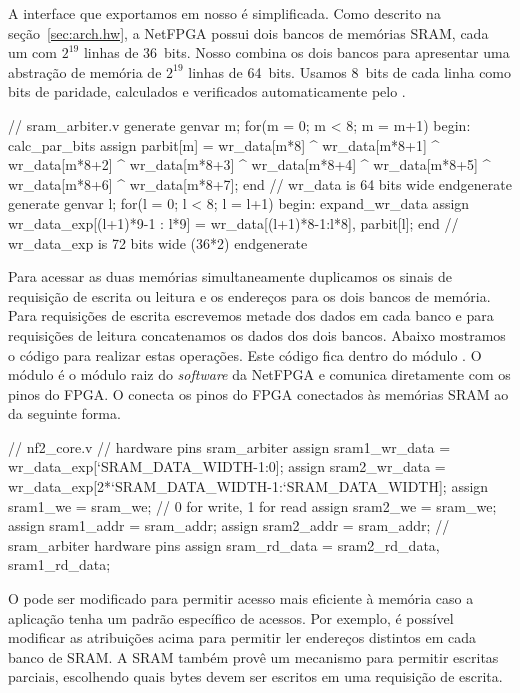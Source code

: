 A interface que exportamos em nosso  é
simplificada.  Como descrito na seção~\ref{sec:arch.hw}, a NetFPGA
possui dois bancos de memórias SRAM, cada um com $2^{19}$ linhas de
36~bits.  Nosso  combina os dois bancos para
apresentar uma abstração de memória de $2^{19}$ linhas de 64~bits.
Usamos 8~bits de cada linha como bits de paridade, calculados e
verificados automaticamente pelo .

\begin{verilogcode}
   // sram_arbiter.v
   generate
      genvar m;
      for(m = 0; m < 8; m = m+1) begin: calc_par_bits
      assign parbit[m] = wr_data[m*8] ^ wr_data[m*8+1] ^
            wr_data[m*8+2] ^ wr_data[m*8+3] ^ wr_data[m*8+4] ^
            wr_data[m*8+5] ^ wr_data[m*8+6] ^ wr_data[m*8+7];
      end // wr_data is 64 bits wide
   endgenerate 
   generate
      genvar l;
      for(l = 0; l < 8; l = l+1) begin: expand_wr_data
         assign wr_data_exp[(l+1)*9-1 : l*9] =
            {wr_data[(l+1)*8-1:l*8], parbit[l]};
         end // wr_data_exp is 72 bits wide (36*2)
   endgenerate
\end{verilogcode}

Para acessar as duas memórias simultaneamente duplicamos os sinais
de requisição de escrita ou leitura e os endereços para os dois
bancos de memória.  Para requisições de escrita escrevemos metade
dos dados em cada banco e para requisições de leitura concatenamos
os dados dos dois bancos.  Abaixo mostramos o código para realizar
estas operações.  Este código fica dentro do módulo .
O módulo  é o módulo raiz do \emph{software} da
NetFPGA e comunica diretamente com os pinos do FPGA.  O
 conecta os pinos do FPGA conectados às memórias SRAM
ao  da seguinte forma.

\begin{verilogcode}
// nf2_core.v
// hardware pins       sram_arbiter
assign sram1_wr_data = wr_data_exp[`SRAM_DATA_WIDTH-1:0];
assign sram2_wr_data = wr_data_exp[2*`SRAM_DATA_WIDTH-1:`SRAM_DATA_WIDTH];
assign sram1_we      = sram_we; // 0 for write, 1 for read
assign sram2_we      = sram_we;
assign sram1_addr    = sram_addr;
assign sram2_addr    = sram_addr;
// sram_arbiter        hardware pins
assign sram_rd_data  = {sram2_rd_data, sram1_rd_data};
\end{verilogcode}

O  pode ser modificado para permitir acesso mais
eficiente à memória caso a aplicação tenha um padrão específico de
acessos.  Por exemplo, é possível modificar as atribuições acima
para permitir ler endereços distintos em cada banco de SRAM.  A SRAM
também provê um mecanismo para permitir escritas parciais,
escolhendo quais bytes devem ser escritos em uma requisição de
escrita.\footnotemark{}

